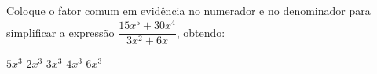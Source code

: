 Coloque o fator comum em evidência no numerador e no denominador para simplificar a expressão $\dfrac{15x^5+30x^4}{3x^2+6x}$, obtendo:

$5x^3$
$2x^3$
$3x^3$
$4x^3$
$6x^3$


